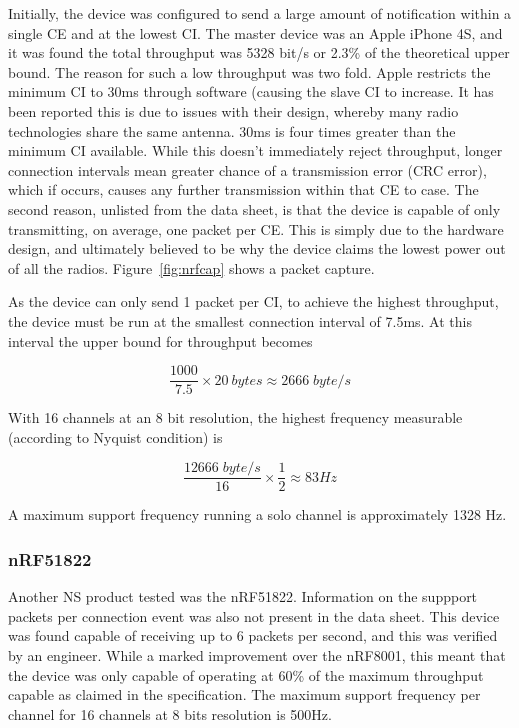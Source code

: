 \documentclass[]{article}
\begin{document}
Initially, the device was configured to send a large amount of notification within a single \ac{CE} and at the lowest \ac{CI}. The master device was an Apple iPhone 4S, and it was found the total throughput was 5328 bit/s or 2.3\% of the theoretical upper bound. The reason for such a low throughput was two fold. Apple restricts the minimum \ac{CI} to 30ms through software (causing the slave \ac{CI} to increase. It has been reported this is due to issues with their design, whereby many radio technologies share the same antenna. 30ms is four times greater than the minimum \ac{CI} available. While this doesn't immediately reject throughput, longer connection intervals mean greater chance of a transmission error (CRC error), which if occurs, causes any further transmission within that \ac{CE} to case. The second reason, unlisted from the data sheet\cite{nrf8001}, is that the device is capable of only transmitting, on average, one packet per \ac{CE}. This is simply due to the hardware design, and ultimately believed to be why the device claims the lowest power out of all the radios. Figure~\ref{fig:nrfcap} shows a packet capture.


As the device can only send 1 packet per \ac{CI}, to achieve the highest throughput, the device must be run at the smallest connection interval of 7.5ms. At this interval the upper bound for throughput becomes

\begin{displaymath}
\frac{1000}{7.5} \times 20\:bytes \approx 2666\;byte/s
\end{displaymath}

With 16 channels at an 8 bit resolution, the highest frequency measurable (according to Nyquist condition) is 

\begin{displaymath}
\frac{1 2666\; byte/s}{16} \times \frac{1}{2} \approx 83  Hz
\end{displaymath}

A maximum support frequency running a solo channel is approximately 1328 Hz.

\subsubsection{nRF51822}
Another \ac{NS} product tested was the nRF51822. Information on the suppport packets per connection event was also not present in the data sheet\cite{nrf51822}. This device was found capable of receiving up to 6 packets per second, and this was verified by an engineer\cite{olme}. While a marked improvement over the nRF8001, this meant that the device was only capable of operating at 60\% of the maximum throughput capable as claimed in the specification. The maximum support frequency per channel for 16 channels at 8 bits resolution is 500Hz.
\end{document}
